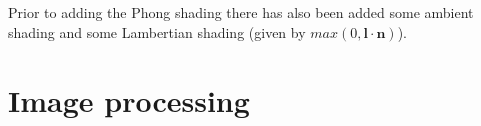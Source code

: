 \documentclass[10pt,a4paper]{article}
\begin{document}
Prior to adding the Phong shading there has also been added some ambient shading and some Lambertian shading (given by $max(0, \mathbf{l} \cdot \mathbf{n})$).

\part{Image processing}
\end{document}

